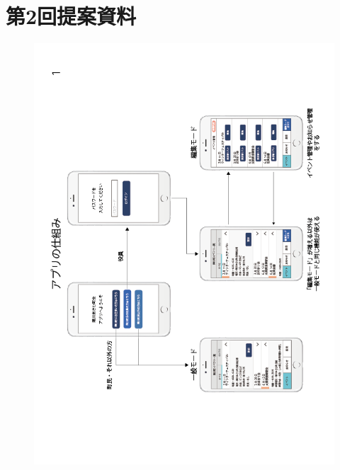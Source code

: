 \chapter{第2回提案資料}
\begin{figure}[h]
    \begin{center}
      \includegraphics[keepaspectratio, scale=0.65]{appendixs/appendixB_figres/fig1.png}
    \end{center}
\end{figure}

